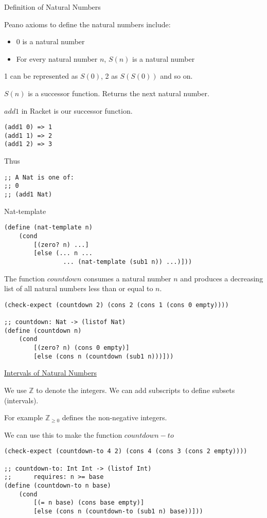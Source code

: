 \documentclass{article}
\begin{document}
Definition of Natural Numbers

Peano axioms to define the natural numbers include:
\begin{itemize}
    \item $0$ is a natural number
    \item For every natural number $n$, $S(n)$ is a natural number
\end{itemize}

1 can be represented as $S(0)$, 2 as $S(S(0))$ and so on. 

$S(n)$ is a successor function. Returns the next natural number. 


$add1$ in Racket is our successor function. 

\begin{lstlisting}
(add1 0) => 1
(add1 1) => 2
(add1 2) => 3
\end{lstlisting}

Thus
\begin{lstlisting}
;; A Nat is one of:
;; 0
;; (add1 Nat)
\end{lstlisting}

Nat-template
\begin{lstlisting}
(define (nat-template n)
    (cond
        [(zero? n) ...]
        [else (... n ... 
                ... (nat-template (sub1 n)) ...)]))
\end{lstlisting}


The function $countdown$ consumes a natural number $n$ and produces a decreasing list of all natural numbers less than or equal to $n$. 

\begin{lstlisting}
(check-expect (countdown 2) (cons 2 (cons 1 (cons 0 empty))))

;; countdown: Nat -> (listof Nat)
(define (countdown n)
    (cond
        [(zero? n) (cons 0 empty)]
        [else (cons n (countdown (sub1 n)))]))
\end{lstlisting}

\underline{Intervals of Natural Numbers}

We use $\mathbb{Z}$ to denote the integers. We can add subscripts to define subsets (intervals). 

For example $\mathbb{Z}_{\ge 0}$ defines the non-negative integers. 

We can use this to make the function $countdown-to$

\begin{lstlisting}
(check-expect (countdown-to 4 2) (cons 4 (cons 3 (cons 2 empty))))

;; countdown-to: Int Int -> (listof Int)
;;      requires: n >= base
(define (countdown-to n base)
    (cond 
        [(= n base) (cons base empty)]
        [else (cons n (countdown-to (sub1 n) base))]))
\end{lstlisting}
\end{document}
